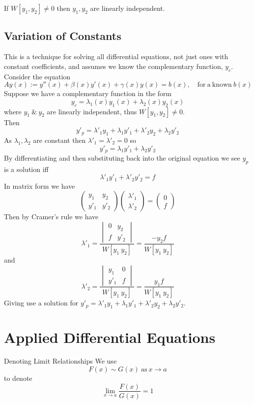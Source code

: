 \documentclass[11pt,a4paper]{article}
\begin{document}
\subtitle{Remark 6.12}{}
If $W[y_1, y_2] \not = 0$ then $y_1, y_2$ are linearly independent.

\subsection{Variation of Constants}
%
\subtitle{Theorem 6.13}{}
This is a technique for solving all differential equations, not just ones with constant coefficients, and assumes we know the complementary function, $y_c$. \\
Consider the equation $$Ay(x) := y''(x) + \beta(x)y'(x) + \gamma(x)y(x) = b(x),\quad \mathrm{for\ a\ known\ }b(x)$$
Suppose we have a complementary function in the form $$y_c = \lambda_1(x)y_1(x) + \lambda_2(x)y_2(x)$$ where $y_1\ \&\ y_2$ are linearly independent, thus $W[y_1, y_2] \not = 0$. \\
Then $$y'_p = \lambda'_1 y_1 + \lambda_1 y'_1 + \lambda'_2 y_2 + \lambda_2 y'_2$$
As $\lambda_1, \lambda_2$ are constant then $\lambda'_1 = \lambda'_2 = 0$ so $$y'_p = \lambda_1y'_1 + \lambda_2y'_2$$
By differentiating and then substituting back into the original equation we see $y_p$ is a solution iff $$\lambda'_1y'_1 + \lambda'_2y'_2 = f$$
In matrix form we have $$\begin{pmatrix} y_1 & y_2 \\ y'_1 & y'_2 \end{pmatrix} \begin{pmatrix} \lambda'_1 \\ \lambda'_2 \end{pmatrix} = \begin{pmatrix} 0 \\ f \end{pmatrix}$$
Then by Cramer's rule we have $$\lambda'_1 = \frac{\begin{vmatrix}0 & y_2 \\ f & y'_2 \end{vmatrix}}{W[y_1\ y_2]} = \frac{-y_2f}{W[y_1\ y_2]}$$
and $$\lambda'_2 = \frac{\begin{vmatrix}y_1 & 0 \\ y'_1 & f \end{vmatrix}}{W[y_1\ y_2]} = \frac{y_1f}{W[y_1\ y_2]}$$
Giving use a solution for $y'_p = \lambda'_1 y_1 + \lambda_1 y'_1 + \lambda'_2 y_2 + \lambda_2 y'_2$.

\section{Applied Differential Equations}
%
\subtitle{Definition 7.01 - }{Denoting Limit Relationships}
We use $$F(x) \sim G(x)\ \mathrm{as}\ x \to a$$ to denote $$\lim_{x \to a} \frac{F(x)}{G(x)} = 1$$
\end{document}
